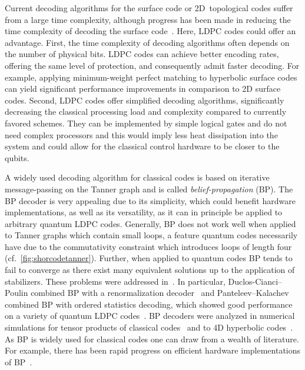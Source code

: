 \documentclass[amsmath, amssymb, floatfix, reprint, twocolumn, notitlepage, 10pt]{revtex4-1}
\begin{document}
Current decoding algorithms for the surface code or 2D~topological codes suffer from a large time complexity, although progress has been made in reducing the time complexity of decoding the surface code~\cite{delfosse2017almost,das2020scalable}.
Here, LDPC codes could offer an advantage.
First, the time complexity of decoding algorithms often depends on the number of physical bits. 
LDPC codes can achieve better encoding rates, offering the same level of protection, and consequently admit faster decoding.
For example, applying minimum-weight perfect matching to hyperbolic surface codes can yield significant performance improvements in comparison to 2D surface codes.
Second, LDPC codes offer simplified decoding algorithms, significantly decreasing the classical processing load and complexity compared to currently favored schemes. 
They can be implemented by simple logical gates and do not need complex processors and this would imply less heat dissipation into the system and could allow for the classical control hardware to be closer to the qubits.

A widely used decoding algorithm for classical codes is based on iterative message-passing on the Tanner graph and is called \emph{belief-propagation} (BP).
The BP decoder is very appealing due to its simplicity, which could benefit hardware implementations, as well as its versatility, as it can in principle be applied to arbitrary quantum LDPC codes.
Generally, BP does not work well when applied to Tanner graphs which contain small loops, a feature quantum codes necessarily have due to the commutativity constraint which introduces loops of length four (cf.~\cref{fig:shorcodetanner}).
Further, when applied to quantum codes BP tends to fail to converge as there exist many equivalent solutions up to the application of stabilizers.
These problems were addressed in~\cite{LEIFER20081899,poulin2008belief,poulin2008iterative,6145510,kuo2020refined,raveendran2019syndrome}.
In particular, Duclos-Cianci--Poulin combined BP with a renormalization decoder~\cite{duclos2010fast} and Panteleev--Kalachev combined BP with ordered statistics decoding, which showed good performance on a variety of quantum LDPC codes~\cite{panteleev2019degenerate}.
BP decoders were analyzed in numerical simulations for tensor products of classical codes~\cite{grospellier2018numerical,grospellier2020combining,roffe2020decoding} and to 4D hyperbolic codes~\cite{breuckmann2020single}.
As BP is widely used for classical codes one can draw from a wealth of literature.
For example, there has been rapid progress on efficient hardware implementations of BP~\cite{liang2011hardware,chen2002near}.
\end{document}
